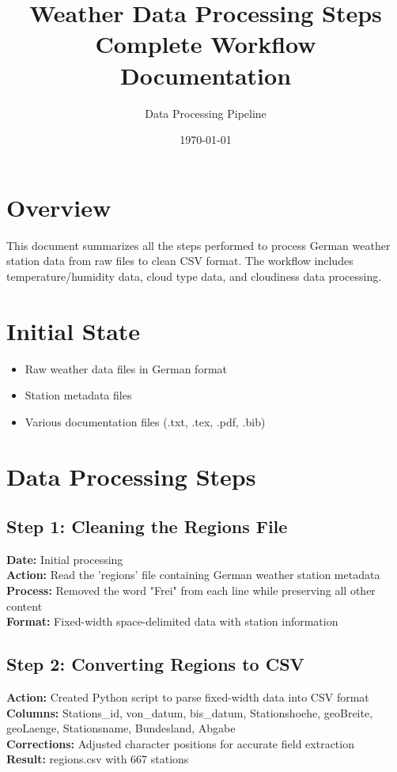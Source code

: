 \documentclass[11pt,a4paper]{article}
\title{\textbf{Weather Data Processing Steps}\\
\large Complete Workflow Documentation}
\author{Data Processing Pipeline}
\date{\today}
\begin{document}
\maketitle

\section{Overview}
This document summarizes all the steps performed to process German weather station data from raw files to clean CSV format. The workflow includes temperature/humidity data, cloud type data, and cloudiness data processing.

\section{Initial State}
\begin{itemize}
    \item Raw weather data files in German format
    \item Station metadata files
    \item Various documentation files (.txt, .tex, .pdf, .bib)
\end{itemize}

\section{Data Processing Steps}

\subsection{Step 1: Cleaning the Regions File}
\textbf{Date:} Initial processing\\
\textbf{Action:} Read the 'regions' file containing German weather station metadata\\
\textbf{Process:} Removed the word "Frei" from each line while preserving all other content\\
\textbf{Format:} Fixed-width space-delimited data with station information

\subsection{Step 2: Converting Regions to CSV}
\textbf{Action:} Created Python script to parse fixed-width data into CSV format\\
\textbf{Columns:} Stations\_id, von\_datum, bis\_datum, Stationshoehe, geoBreite, geoLaenge, Stationsname, Bundesland, Abgabe\\
\textbf{Corrections:} Adjusted character positions for accurate field extraction\\
\textbf{Result:} regions.csv with 667 stations
\end{document}
